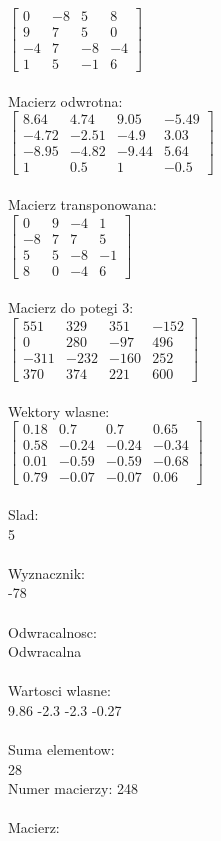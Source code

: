 \documentclass[a4paper,12pt]{article}
\begin{document}
$\begin{bmatrix} 0&-8&5&8\\9&7&5&0\\-4&7&-8&-4\\1&5&-1&6 \end{bmatrix}$
\\
\\
Macierz odwrotna:\\

$\begin{bmatrix} 8.64&4.74&9.05&-5.49\\-4.72&-2.51&-4.9&3.03\\-8.95&-4.82&-9.44&5.64\\1&0.5&1&-0.5 \end{bmatrix}$
\\
\\
Macierz transponowana:\\

$\begin{bmatrix} 0&9&-4&1\\-8&7&7&5\\5&5&-8&-1\\8&0&-4&6 \end{bmatrix}$
\\
\\
Macierz do potegi 3:\\

$\begin{bmatrix} 551&329&351&-152\\0&280&-97&496\\-311&-232&-160&252\\370&374&221&600 \end{bmatrix}$
\\
\\
Wektory wlasne:\\

$\begin{bmatrix} 0.18&0.7&0.7&0.65\\0.58&-0.24&-0.24&-0.34\\0.01&-0.59&-0.59&-0.68\\0.79&-0.07&-0.07&0.06 \end{bmatrix}$
\\
\\
Slad:\\
5
\\
\\
Wyznacznik:\\
-78
\\
\\
Odwracalnosc:\\
Odwracalna
\\
\\
Wartosci wlasne:\\
9.86 -2.3 -2.3 -0.27
\\
\\
Suma elementow:\\
28
\\
\newpage
Numer macierzy:
248
\\
\\
Macierz:\\
\end{document}
